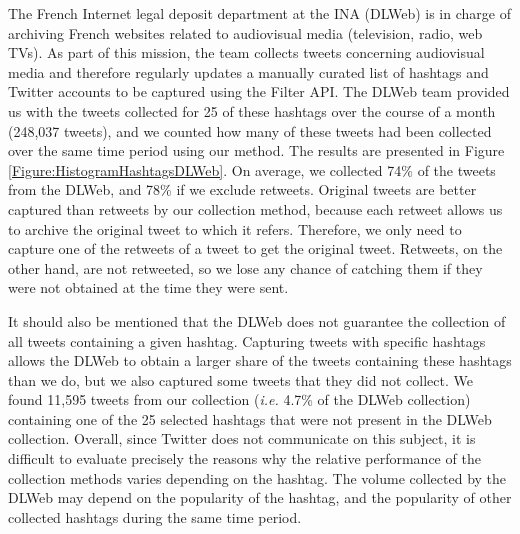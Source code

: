 The French Internet legal deposit department at the INA (DLWeb) is in charge of archiving French websites related to audiovisual media (television, radio, web TVs). As part of this mission, the team collects tweets concerning audiovisual media and therefore regularly updates a manually curated list of hashtags and Twitter accounts to be captured using the Filter API. The DLWeb team provided us with the tweets collected for 25 of these hashtags over the course of a month (248,037 tweets), and we counted how many of these tweets had been collected over the same time period using our method. The results are presented in Figure \ref{Figure:HistogramHashtagsDLWeb}. On average, we collected 74\% of the tweets from the DLWeb, and 78\% if we exclude retweets. Original tweets are better captured than retweets by our collection method, because each retweet allows us to archive the original tweet to which it refers. Therefore, we only need to capture one of the retweets of a tweet to get the original tweet. Retweets, on the other hand, are not retweeted, so we lose any chance of catching them if they were not obtained at the time they were sent.



It should also be mentioned that the DLWeb does not guarantee the collection of all tweets containing a given hashtag. Capturing tweets with specific hashtags allows the DLWeb to obtain a larger share of the tweets containing these hashtags than we do, but we also captured some tweets that they did not collect. We found 11,595 tweets from our collection (\textit{i.e.}  4.7\% of the DLWeb collection) containing one of the 25 selected hashtags that were not present in the DLWeb collection.
Overall, since Twitter does not communicate on this subject, it is difficult to evaluate precisely the reasons why the relative performance of the collection methods varies depending on the hashtag. The volume collected by the DLWeb may depend on the popularity of the hashtag, and the popularity of other collected hashtags during the same time period.

